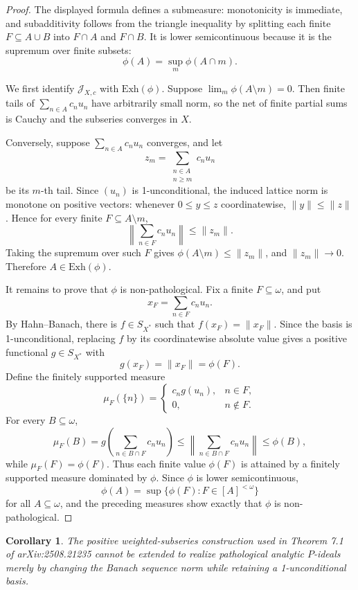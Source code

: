 \documentclass[11pt]{article}
\newtheorem{corollary}{Corollary}
\newcommand{\Exh}{\mathrm{Exh}}
\begin{document}
\begin{proof}
The displayed formula defines a submeasure: monotonicity is immediate, and
subadditivity follows from the triangle inequality by splitting each finite
\(F\subseteq A\cup B\) into \(F\cap A\) and \(F\cap B\).  It is lower
semicontinuous because it is the supremum over finite subsets:
\[
  \phi(A)=\sup_m \phi(A\cap m).
\]

We first identify \(\mathcal J_{X,c}\) with \(\Exh(\phi)\).  Suppose
\(\lim_m\phi(A\setminus m)=0\).  Then finite tails of
\(\sum_{n\in A}c_nu_n\) have arbitrarily small norm, so the net of finite
partial sums is Cauchy and the subseries converges in \(X\).

Conversely, suppose \(\sum_{n\in A}c_nu_n\) converges, and let
\[
  z_m=\sum_{\substack{n\in A\\ n\geq m}} c_n u_n
\]
be its \(m\)-th tail.  Since \((u_n)\) is 1-unconditional, the induced lattice
norm is monotone on positive vectors: whenever \(0\leq y\leq z\)
coordinatewise, \(\|y\|\leq\|z\|\).  Hence for every finite
\(F\subseteq A\setminus m\),
\[
  \left\|\sum_{n\in F}c_nu_n\right\|\leq \|z_m\|.
\]
Taking the supremum over such \(F\) gives \(\phi(A\setminus m)\leq\|z_m\|\),
and \(\|z_m\|\to0\).  Therefore \(A\in\Exh(\phi)\).

It remains to prove that \(\phi\) is non-pathological.  Fix a finite
\(F\subseteq\omega\), and put
\[
  x_F=\sum_{n\in F}c_nu_n.
\]
By Hahn--Banach, there is \(f\in S_{X^*}\) such that \(f(x_F)=\|x_F\|\).  Since
the basis is 1-unconditional, replacing \(f\) by its coordinatewise absolute
value gives a positive functional \(g\in S_{X^*}\) with
\[
  g(x_F)=\|x_F\|=\phi(F).
\]
Define the finitely supported measure
\[
  \mu_F(\{n\})=
  \begin{cases}
    c_n g(u_n), & n\in F,\\
    0, & n\notin F.
  \end{cases}
\]
For every \(B\subseteq\omega\),
\[
  \mu_F(B)=g\left(\sum_{n\in B\cap F}c_nu_n\right)
  \leq
  \left\|\sum_{n\in B\cap F}c_nu_n\right\|
  \leq \phi(B),
\]
while \(\mu_F(F)=\phi(F)\).  Thus each finite value \(\phi(F)\) is attained by
a finitely supported measure dominated by \(\phi\).  Since \(\phi\) is lower
semicontinuous,
\[
  \phi(A)=\sup\{\phi(F):F\in[A]^{<\omega}\}
\]
for all \(A\subseteq\omega\), and the preceding measures show exactly that
\(\phi\) is non-pathological.
\end{proof}

\begin{corollary}
The positive weighted-subseries construction used in Theorem 7.1 of
arXiv:2508.21235 cannot be extended to realize pathological analytic
\(P\)-ideals merely by changing the Banach sequence norm while retaining a
1-unconditional basis.
\end{corollary}
\end{document}

